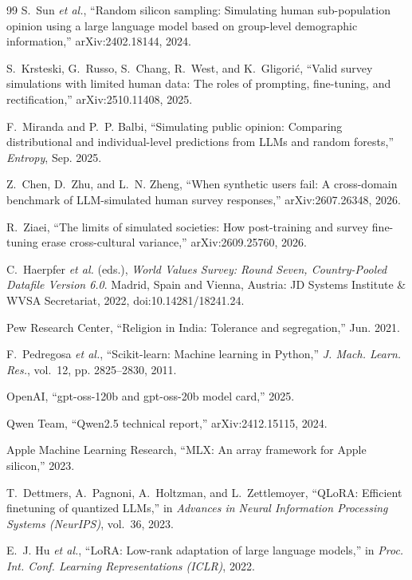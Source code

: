 \documentclass[conference]{IEEEtran}
\begin{document}
\begin{thebibliography}{99}
S.~Sun \emph{et al.}, ``Random silicon sampling: Simulating human sub-population opinion using a large language model based on group-level demographic information,'' arXiv:2402.18144, 2024.

S.~Krsteski, G.~Russo, S.~Chang, R.~West, and K.~Gligori\'{c}, ``Valid survey simulations with limited human data: The roles of prompting, fine-tuning, and rectification,'' arXiv:2510.11408, 2025.

F.~Miranda and P.~P. Balbi, ``Simulating public opinion: Comparing distributional and individual-level predictions from LLMs and random forests,'' \emph{Entropy}, Sep. 2025.

Z.~Chen, D.~Zhu, and L.~N. Zheng, ``When synthetic users fail: A cross-domain benchmark of LLM-simulated human survey responses,'' arXiv:2607.26348, 2026.

R.~Ziaei, ``The limits of simulated societies: How post-training and survey fine-tuning erase cross-cultural variance,'' arXiv:2609.25760, 2026.

C.~Haerpfer \emph{et al.} (eds.), \emph{World Values Survey: Round Seven, Country-Pooled Datafile Version 6.0}. Madrid, Spain and Vienna, Austria: JD Systems Institute \& WVSA Secretariat, 2022, doi:10.14281/18241.24.

Pew Research Center, ``Religion in India: Tolerance and segregation,'' Jun. 2021.

F.~Pedregosa \emph{et al.}, ``Scikit-learn: Machine learning in Python,'' \emph{J. Mach. Learn. Res.}, vol.~12, pp. 2825--2830, 2011.

OpenAI, ``gpt-oss-120b and gpt-oss-20b model card,'' 2025.

Qwen Team, ``Qwen2.5 technical report,'' arXiv:2412.15115, 2024.

Apple Machine Learning Research, ``MLX: An array framework for Apple silicon,'' 2023.

T.~Dettmers, A.~Pagnoni, A.~Holtzman, and L.~Zettlemoyer, ``QLoRA: Efficient finetuning of quantized LLMs,'' in \emph{Advances in Neural Information Processing Systems (NeurIPS)}, vol.~36, 2023.

E.~J. Hu \emph{et al.}, ``LoRA: Low-rank adaptation of large language models,'' in \emph{Proc. Int. Conf. Learning Representations (ICLR)}, 2022.


\end{thebibliography}
\end{document}
